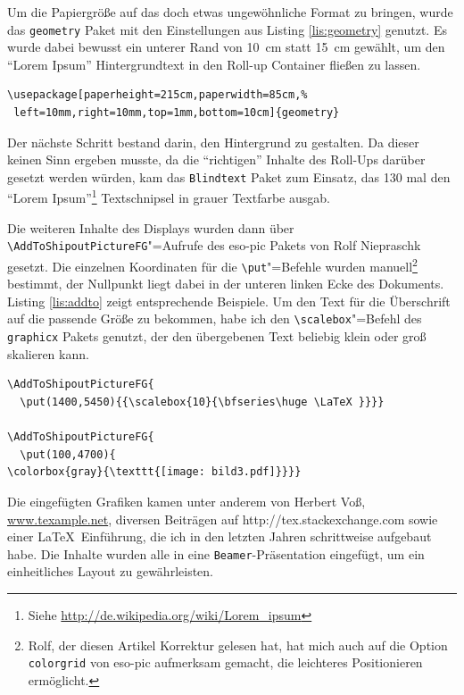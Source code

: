 \documentclass[12pt,ngerman]{dtk}
\begin{document}
Um die Papiergröße auf das doch etwas ungewöhnliche Format zu bringen, wurde das \texttt{geometry} Paket mit den Einstellungen aus Listing \ref{lis:geometry} genutzt. Es wurde dabei bewusst ein unterer Rand von \SI{10}{\centi\meter} statt \SI{15}{\centi\meter} gewählt, um den \enquote{Lorem Ipsum} Hintergrundtext in den Roll-up Container fließen zu lassen.  

\begin{lstlisting}[caption={Einstellungen des \texttt{geometry} Pakets},label={lis:geometry}]
\usepackage[paperheight=215cm,paperwidth=85cm,%
 left=10mm,right=10mm,top=1mm,bottom=10cm]{geometry}
\end{lstlisting}

Der nächste Schritt bestand darin, den Hintergrund zu gestalten. Da dieser keinen Sinn ergeben musste, da die \enquote{richtigen} Inhalte des Roll-Ups darüber gesetzt werden würden, kam das \texttt{Blindtext} Paket zum Einsatz, das 130 mal den \enquote{Lorem Ipsum}\footnote{Siehe \url{http://de.wikipedia.org/wiki/Lorem_ipsum}} Textschnipsel in grauer Textfarbe ausgab.

Die weiteren Inhalte des Displays wurden dann über \verb|\AddToShipoutPictureFG|"=Aufrufe des eso-pic Pakets von Rolf Niepraschk gesetzt. Die einzelnen Koordinaten für die \verb|\put|"=Befehle wurden manuell\footnote{Rolf, der diesen Artikel Korrektur gelesen hat, hat mich auch auf die Option \texttt{colorgrid} von eso-pic aufmerksam gemacht, die leichteres Positionieren ermöglicht.} bestimmt, der Nullpunkt liegt dabei in der unteren linken Ecke des Dokuments. Listing \ref{lis:addto} zeigt entsprechende Beispiele. Um den Text für die Überschrift auf die passende Größe zu bekommen, habe ich den \verb|\scalebox|"=Befehl des \texttt{graphicx} Pakets genutzt, der den übergebenen Text beliebig klein oder groß skalieren kann. 

\begin{lstlisting}[caption={\texttt{\textbackslash AddToShipoutPictureFG} Aufrufe für Überschrift und Bild},label={lis:addto}]
\AddToShipoutPictureFG{
  \put(1400,5450){{\scalebox{10}{\bfseries\huge \LaTeX }}}}

\AddToShipoutPictureFG{
  \put(100,4700){
\colorbox{gray}{\texttt{[image: bild3.pdf]}}}}
\end{lstlisting}

Die eingefügten Grafiken kamen unter anderem von Herbert Voß, \url{www.texample.net}, diversen Beiträgen auf http://tex.stackexchange.com sowie einer \LaTeX\ Einführung, die ich in den letzten Jahren schrittweise aufgebaut habe. Die Inhalte wurden alle in eine \texttt{Beamer}-Präsentation eingefügt, um  ein einheitliches Layout zu gewährleisten. 
\end{document}
